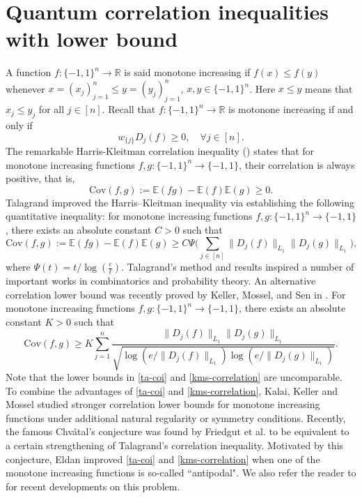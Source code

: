 \documentclass{amsbook}
\theoremstyle{definition}
\theoremstyle{remark}
\numberwithin{section}{chapter}
\numberwithin{equation}{chapter}
\newcommand{\1}{\mathbf{1}}
\begin{document}
\chapter{Quantum correlation inequalities with lower bound}\label{sec-tala-correlation}
A function $f: \{-1,1\}^n\to \mathbb{R}$ is said monotone  increasing if $f(x)\leq f(y)$ whenever $x=(x_j)_{j=1}^n\leq y=(y_j)_{j=1}^n$, $x,y\in \{-1,1\}^n$. Here $x\leq y$ means that $x_j\leq y_j$ for all $j\in [n]$. Recall that $f: \{-1,1\}^n\to \mathbb{R}$ is motonone  increasing if and only if 
\begin{equation}\label{basic-mi}
w_{\{j\}}D_j(f)\geq 0,\quad \forall j\in [n].
\end{equation}
The remarkable Harris-Kleitman correlation inequality (\cite{Ha1960,Kl1966}) states that for monotone increasing functions $f,g: \{-1,1\}^n\to \{-1,1\}$, their correlation is always positive, that is, 
\begin{equation}\label{hk-ine}
\mathrm{Cov}(f,g):=\mathbb{E}(fg)-\mathbb{E}(f)\mathbb{E}(g)\geq 0.
\end{equation}
Talagrand \cite{Ta1996} improved the Harris--Kleitman inequality via establishing the following quantitative inequality: for monotone increasing functions 
$f,g: \{-1,1\}^n\to \{-1,1\}$, there exists an absolute constant $C>0$ such that 
\begin{equation}\label{ta-coi}
\mathrm{Cov}(f,g):=\mathbb{E}(fg)-\mathbb{E}(f)\mathbb{E}(g)\geq C \Psi\Big(\sum_{j\in [n]} \|D_j(f)\|_{L_1}\|D_j(g)\|_{L_1}\Big),
\end{equation}
where $\Psi(t)=t/\log(\frac{e}{t})$. 
Talagrand's method and results inspired a number of important
works in combinatorics and probability theory.
An alternative correlation lower bound was recently proved  by
Keller, Mossel, and Sen in \cite{KMS2014}. For monotone increasing functions 
$f,g: \{-1,1\}^n\to \{-1,1\}$, there exists an absolute constant $K>0$ such that
	\begin{equation}\label{kms-correlation}
	\mathrm{Cov}(f,g)\geq K\sum_{j=1}^{n}\frac{\|D_{j}(f)\|_{L_{1}}\|D_{j}(g)\|_{L_{1}}}{\sqrt{\log(e/\|D_{j}(f)\|_{L_{1}})\log(e/\|D_{j}(g)\|_{L_{1}})}}.
\end{equation}
Note that the lower bounds in \eqref{ta-coi} and \eqref{kms-correlation} are uncomparable. To combine the advantages of \eqref{ta-coi} and \eqref{kms-correlation}, Kalai, Keller and Mossel \cite{KKM2016} studied  stronger correlation lower bounds for monotone increasing functions 
under additional natural regularity or symmetry conditions.
Recently, the famous Chv\'{a}tal's conjecture  was found by Friedgut et al. 
 \cite{FKKK2018} to be equivalent to a certain strengthening of Talagrand's correlation inequality. Motivated by this conjecture, Eldan \cite{El2022} improved \eqref{ta-coi} and \eqref{kms-correlation} when one of the monotone increasing functions is so-called ``antipodal". We also refer the reader to \cite{CC2025} for  recent developments on this problem.
 
\end{document}
